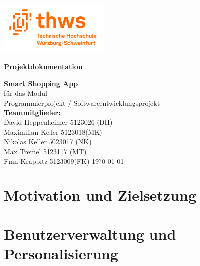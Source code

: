 \documentclass[12pt, a4paper]{report} %
\newcommand{\authorinitials}{} %
\begin{document}
\begin{titlepage}
    \begin{center}
        \includegraphics[width=0.4\textwidth]{media/THWS_logo.png}
    \end{center}
    \centering
    \vspace*{2cm}
    {\LARGE\bfseries Projektdokumentation \par}
    \vspace{1.5cm}
    {\Large \textbf{Smart Shopping App} \\[3mm]}
    \vspace{1cm}
    {\large für das Modul\\
      Programmierprojekt / Softwareentwicklungsprojekt\\}
    \vspace{1.5cm}
    {\large
      \textbf{Teammitglieder:}\\[5mm]
      David Heppenheimer 5123026 (DH)\\
      Maximilian Keller 5123018(MK)\\
      Nikolas Keller 5023017 (NK)\\
      Max Tremel 5123117 (MT)\\
      Finn Krappitz 5123009(FK)
    }
    \vfill
    {\large \today}
\end{titlepage}

\tableofcontents
\cleardoublepage

\chapter{Motivation und Zielsetzung}










  




\chapter{Benutzerverwaltung und Personalisierung}
\renewcommand{\authorinitials}{FK}



\end{document}
